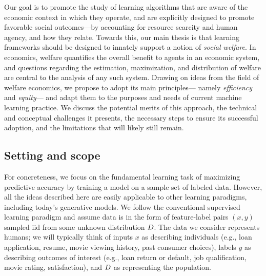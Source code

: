Our goal is to promote the study of learning algorithms that are aware of the economic context in which they operate, and are explicitly designed to promote favorable social outcomes---by accounting for
resource scarcity and human agency, and how they relate.
Towards this, our main thesis is that learning frameworks should be designed to innately support a notion of \emph{social welfare}.
In economics, welfare quantifies the overall benefit to agents in an economic system,
and questions regarding the estimation, maximization, and distribution of welfare are central to the analysis of any such system.
Drawing on ideas from the field of welfare economics,
we propose to adopt its main principles---%
namely \emph{efficiency} and \emph{equity}---%
and adapt them to the purposes and needs of current machine learning practice.
We discuss the potential merits of this approach, 
the technical and conceptual challenges it presents,
the necessary steps to ensure its successful adoption,
and the limitations that will likely still remain.
\squeeze




\subsection{Setting and scope} \label{sec:setting}
For concreteness, we focus on the fundamental 
learning task of maximizing predictive 
accuracy by training a 
model on
a sample set of 
labeled data.
  However, all the ideas described here are easily applicable to other learning paradigms, including today's generative models. 
We follow the conventional supervised learning paradigm
and assume data is in the form of feature-label pairs $(x,y)$
sampled iid from some unknown distribution ${D}$.
The data we consider represents humans;
we will typically think of inputs $x$ as describing individuals 
(e.g., loan application, resume, movie viewing history, past consumer choices),
labels $y$ as describing outcomes of interest
(e.g., loan return or default, job qualification, movie rating, satisfaction),
and ${D}$ as representing the population.

